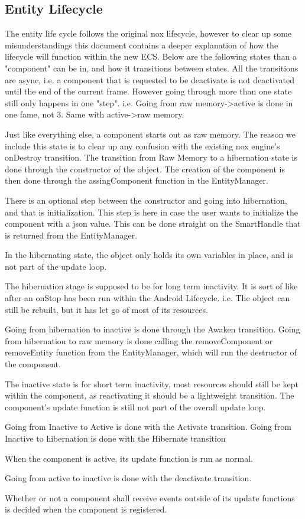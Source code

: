 \subsection{Entity Lifecycle}
The entity life cycle follows the original nox lifecycle,
however to clear up some misunderstandings this document contains a deeper explanation of how the lifecycle will function within the new ECS.
Below are the following states than a "component" can be in, and how it transitions between states.
All the transitions are async, i.e. a component that is requested to be deactivate is not deactivated until the end of the current frame.
However going through more than one state still only happens in one "step".
i.e. Going from raw memory->active is done in one fame, not 3. Same with active->raw memory.

Just like everything else, a component starts out as raw memory. 
The reason we include this state is to clear up any confusion with the existing nox engine's onDestroy transition. 
The transition from Raw Memory to a hibernation state is done through the constructor of the object. The creation of the component is then done through the assingComponent function in the EntityManager.

There is an optional step between the constructor and going into hibernation, and that is initialization. 
This step is here in case the user wants to initialize the component with a json value. This can be done straight on the SmartHandle that is returned from the EntityManager. 

In the hibernating state, the object only holds its own variables in place, and is not part of the update loop.

The hibernation stage is supposed to be for long term inactivity.
It is sort of like after an onStop has been run within the Android Lifecycle. i.e. The object can still be rebuilt, but it has let go of most of its resources.

Going from hibernation to inactive is done through the Awaken transition.
Going from hibernation to raw memory is done calling the removeComponent or removeEntity function from the EntityManager, 
which will run the destructor of the component.

The inactive state is for short term inactivity, most resources should still be kept within the component, 
as reactivating it should be a lightweight transition.
The component's update function is still not part of the overall update loop.

Going from Inactive to Active is done with the Activate transition.
Going from Inactive to hibernation is done with the Hibernate transition

When the component is active, its update function is run as normal.

Going from active to inactive is done with the deactivate transition.

Whether or not a component shall receive events outside of its update functions is decided when the component is registered.
